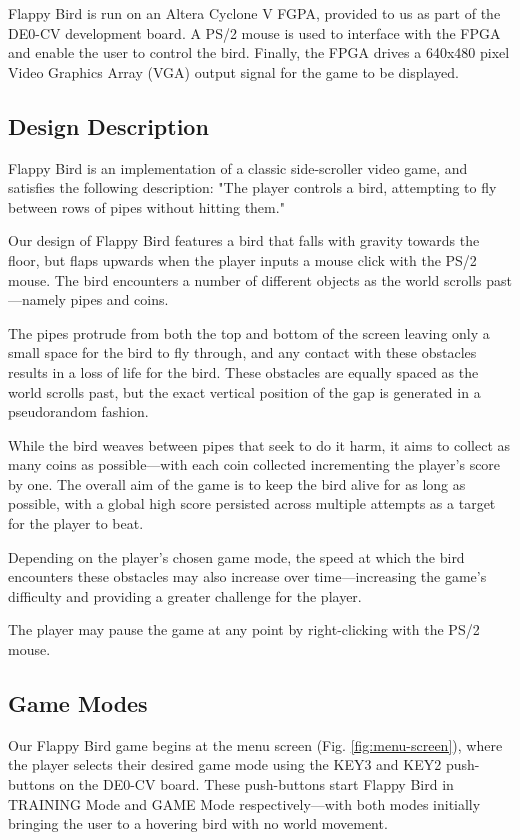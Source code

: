\documentclass[conference]{IEEEtran}
\begin{document}
Flappy Bird is run on an Altera Cyclone V FGPA, provided to us as part of the DE0-CV development board. A PS/2 mouse is used to interface with the FPGA and enable the user to control the bird. Finally, the FPGA drives a 640x480 pixel Video Graphics Array (VGA) output signal for the game to be displayed.

\subsection{Design Description}

Flappy Bird is an implementation of a classic side-scroller video game, and satisfies the following description: "The player controls a bird, attempting to fly between rows of pipes without hitting them."

Our design of Flappy Bird features a bird that falls with gravity towards the floor, but flaps upwards when the player inputs a mouse click with the PS/2 mouse. The bird encounters a number of different objects as the world scrolls past—namely pipes and coins.

The pipes protrude from both the top and bottom of the screen leaving only a small space for the bird to fly through, and any contact with these obstacles results in a loss of life for the bird. These obstacles are equally spaced as the world scrolls past, but the exact vertical position of the gap is generated in a pseudorandom fashion.

While the bird weaves between pipes that seek to do it harm, it aims to collect as many coins as possible—with each coin collected incrementing the player's score by one. The overall aim of the game is to keep the bird alive for as long as possible, with a global high score persisted across multiple attempts as a target for the player to beat.

Depending on the player's chosen game mode, the speed at which the bird encounters these obstacles may also increase over time—increasing the game's difficulty and providing a greater challenge for the player.

The player may pause the game at any point by right-clicking with the PS/2 mouse.

\subsection{Game Modes}

Our Flappy Bird game begins at the menu screen (Fig. \ref{fig:menu-screen}), where the player selects their desired game mode using the KEY3 and KEY2 push-buttons on the DE0-CV board. These push-buttons start Flappy Bird in TRAINING Mode and GAME Mode respectively—with both modes initially bringing the user to a hovering bird with no world movement.
\end{document}

